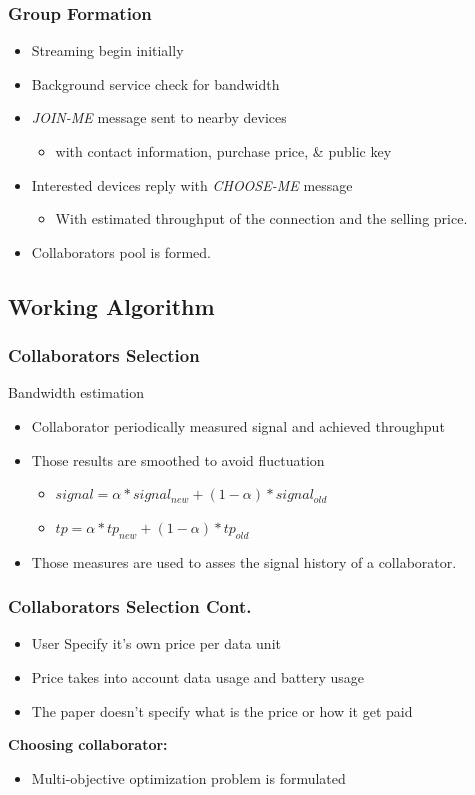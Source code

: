 \documentclass{beamer} %
\begin{document}
\begin{frame}
\frametitle{Group Formation}
\begin{itemize}
\item Streaming begin initially
\item Background service check for bandwidth
\item \textit{JOIN-ME} message sent to nearby devices
\begin{itemize}
\item with contact information, purchase price, \& public key
\end{itemize}
\item Interested devices reply with \textit{CHOOSE-ME} message
\begin{itemize}
\item With estimated throughput of the connection and the selling price.
\end{itemize}
\item Collaborators pool is formed.
\end{itemize}
\end{frame}

\subsection{Working Algorithm}
\begin{frame}
\frametitle{Collaborators Selection}
Bandwidth estimation
\begin{itemize}
\item Collaborator periodically measured signal and achieved throughput
\item Those results are smoothed to avoid fluctuation 
\begin{itemize}
\item $signal=\alpha * signal_{new}+(1-\alpha)* signal_{old}$
\item $tp=\alpha * tp_{new}+(1-\alpha)* tp_{old}$
\end{itemize}
\item Those measures are used to asses the signal history of a collaborator.
\end{itemize}
\end{frame}

\begin{frame}
\frametitle{Collaborators Selection Cont.}
\begin{itemize}
\item User Specify it's own price per data unit
\item Price takes into account data usage and battery usage
\item The paper doesn't specify what is the price or how it get paid
\end{itemize}
\textbf{Choosing collaborator:}
\begin{itemize}
\item Multi-objective optimization problem is formulated
\end{itemize}
\end{frame}
\end{document}
